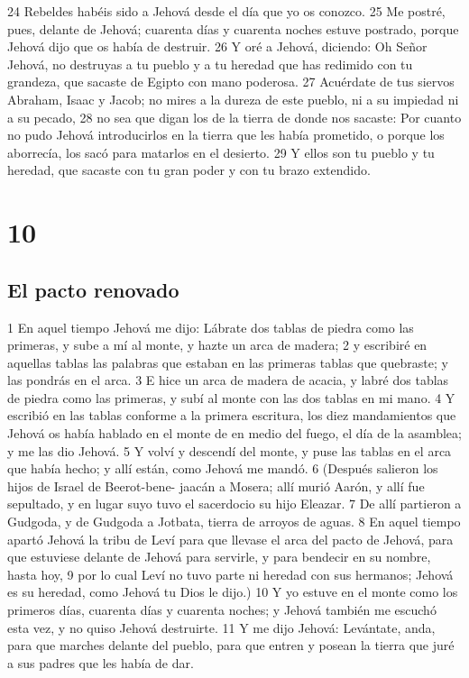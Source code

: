 24 Rebeldes habéis sido a Jehová desde el día que yo os conozco.
25 Me postré, pues, delante de Jehová; cuarenta días y cuarenta noches estuve postrado, porque Jehová dijo que os había de destruir.
26 Y oré a Jehová, diciendo: Oh Señor Jehová, no destruyas a tu pueblo y a tu heredad que has redimido con tu grandeza, que sacaste de Egipto con mano poderosa.
27 Acuérdate de tus siervos Abraham, Isaac y Jacob; no mires a la dureza de este pueblo, ni a su impiedad ni a su pecado,
28 no sea que digan los de la tierra de donde nos sacaste: Por cuanto no pudo Jehová introducirlos en la tierra que les había prometido, o porque los aborrecía, los sacó para matarlos en el desierto.
29 Y ellos son tu pueblo y tu heredad, que sacaste con tu gran poder y con tu brazo extendido.

\chapter{10}

\section{El pacto renovado}

1 En aquel tiempo Jehová me dijo: Lábrate dos tablas de piedra como las primeras, y sube a mí al monte, y hazte un arca de madera;
2 y escribiré en aquellas tablas las palabras que estaban en las primeras tablas que quebraste; y las pondrás en el arca.
3 E hice un arca de madera de acacia, y labré dos tablas de piedra como las primeras, y subí al monte con las dos tablas en mi mano.
4 Y escribió en las tablas conforme a la primera escritura, los diez mandamientos que Jehová os había hablado en el monte de en medio del fuego, el día de la asamblea; y me las dio Jehová.
5 Y volví y descendí del monte, y puse las tablas en el arca que había hecho; y allí están, como Jehová me mandó.
6 (Después salieron los hijos de Israel de Beerot-bene- jaacán a Mosera; allí murió Aarón, y allí fue sepultado, y en lugar suyo tuvo el sacerdocio su hijo Eleazar.
7 De allí partieron a Gudgoda, y de Gudgoda a Jotbata, tierra de arroyos de aguas.
8 En aquel tiempo apartó Jehová la tribu de Leví  para que llevase el arca del pacto de Jehová, para que estuviese delante de Jehová para servirle, y para bendecir en su nombre, hasta hoy,
9 por lo cual Leví no tuvo parte ni heredad con sus hermanos; Jehová es su heredad, como Jehová tu Dios le dijo.)
10 Y yo estuve en el monte como los primeros días, cuarenta días y cuarenta noches; y Jehová también me escuchó esta vez, y no quiso Jehová destruirte.
11 Y me dijo Jehová: Levántate, anda, para que marches delante del pueblo, para que entren y posean la tierra que juré a sus padres que les había de dar.

